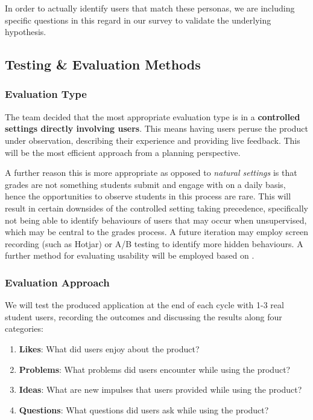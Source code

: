 In order to actually identify users that match these personas, we are including specific questions in this regard in our survey to validate the underlying hypothesis.

\subsection{Testing \& Evaluation Methods}

\subsubsection{Evaluation Type}
The team decided that the most appropriate evaluation type is in a \textbf{controlled settings directly involving users}. This means having users peruse the product under observation, describing their experience and providing live feedback. This will be the most efficient approach from a planning perspective.

A further reason this is more appropriate as opposed to \textit{natural settings} is that grades are not something students submit and engage with on a daily basis, hence the opportunities to observe students in this process are rare. This will result in certain downsides of the controlled setting taking precedence, specifically not being able to identify behaviours of users that may occur when unsupervised, which may be central to the grades process. A future iteration may employ screen recording (such as Hotjar) or A/B testing to identify more hidden behaviours. A further method for evaluating usability will be employed based on \cite{lewis}.

\subsubsection{Evaluation Approach}

We will test the produced application at the end of each cycle with 1-3 real student users, recording the outcomes and discussing the results along four categories:

\begin{enumerate}
    \item \textbf{Likes}: What did users enjoy about the product?
    \item \textbf{Problems}: What problems did users encounter while using the product?
    \item \textbf{Ideas}: What are new impulses that users provided while using the product?
     \item \textbf{Questions}: What questions did users ask while using the product?
\end{enumerate}

